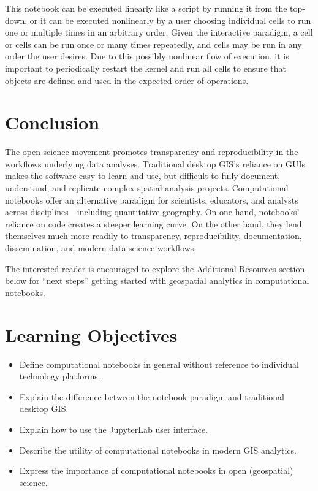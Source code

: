 \documentclass[11pt,letterpaper]{article}
\begin{document}
This notebook can be executed linearly like a script by running it from the top-down, or it can be executed nonlinearly by a user choosing individual cells to run one or multiple times in an arbitrary order. Given the interactive paradigm, a cell or cells can be run once or many times repeatedly, and cells may be run in any order the user desires. Due to this possibly nonlinear flow of execution, it is important to periodically restart the kernel and run all cells to ensure that objects are defined and used in the expected order of operations.

\section{Conclusion}

The open science movement promotes transparency and reproducibility in the workflows underlying data analyses. Traditional desktop GIS's reliance on GUIs makes the software easy to learn and use, but difficult to fully document, understand, and replicate complex spatial analysis projects. Computational notebooks offer an alternative paradigm for scientists, educators, and analysts across disciplines---including quantitative geography. On one hand, notebooks' reliance on code creates a steeper learning curve. On the other hand, they lend themselves much more readily to transparency, reproducibility, documentation, dissemination, and modern data science workflows.

The interested reader is encouraged to explore the Additional Resources section below for \enquote{next steps} getting started with geospatial analytics in computational notebooks.

\setlength{\bibsep}{0.00cm plus 0.05cm}



\section*{Learning Objectives}

\begin{itemize}
    \item Define computational notebooks in general without reference to individual technology platforms.
    \item Explain the difference between the notebook paradigm and traditional desktop GIS.
    \item Explain how to use the JupyterLab user interface.
    \item Describe the utility of computational notebooks in modern GIS analytics.
    \item Express the importance of computational notebooks in open (geospatial) science.
\end{itemize}
\end{document}
